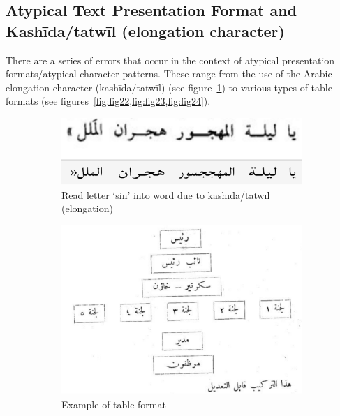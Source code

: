 \subsection{Atypical Text Presentation Format and Kashīda/tatwīl (elongation character)}

There are a series of errors that occur in the context of atypical presentation
formats/atypical character patterns. These range from the use of the Arabic
elongation character (kashīda/tatwīl) (see figure~\ref{fig:fig21}) to various types of table
formats (see figures~\ref{fig:fig22,fig:fig23,fig:fig24}).

\begin{figure}[h]
	\centering
	\begin{subfigure}[b]{0.45\linewidth}
	\centering
	\includegraphics[width=\textwidth]{images/image2.png}
	\caption{Read letter ‘sin’ into word due to kashīda/tatwīl (elongation)}
	\label{fig:fig21}
	\end{subfigure}
	\begin{subfigure}[b]{0.45\linewidth}
	\centering
	\includegraphics[width=\textwidth]{images/image31.png}
	\caption{Example of table format}
	\label{fig:fig22}
	\end{subfigure}
	\begin{subfigure}[b]{0.45\linewidth}

\end{subfigure}
\end{figure}
